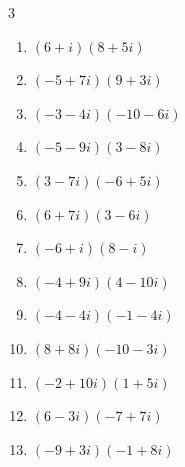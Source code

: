 \begin{multicols}{3}
\begin{enumerate}
  \item $\displaystyle (6+i)(8+5i)$

        \phantom{$\displaystyle =43+38i$}

  \item $\displaystyle (-5+7i)(9+3i)$

        \phantom{$\displaystyle =-66+48i$}

  \item $\displaystyle (-3-4i)(-10-6i)$

        \phantom{$\displaystyle =6+58i$}

  \item $\displaystyle (-5-9i)(3-8i)$

        \phantom{$\displaystyle =-87+13i$}

  \item $\displaystyle (3-7i)(-6+5i)$

        \phantom{$\displaystyle =17+57i$}

  \item $\displaystyle (6+7i)(3-6i)$

        \phantom{$\displaystyle =60-15i$}

  \item $\displaystyle (-6+i)(8-i)$

        \phantom{$\displaystyle =-47+14i$}

  \item $\displaystyle (-4+9i)(4-10i)$

        \phantom{$\displaystyle =74+76i$}

  \item $\displaystyle (-4-4i)(-1-4i)$

        \phantom{$\displaystyle =-12+20i$}

  \item $\displaystyle (8+8i)(-10-3i)$

        \phantom{$\displaystyle =-56-104i$}

  \item $\displaystyle (-2+10i)(1+5i)$

        \phantom{$\displaystyle =-52$}

\columnbreak %

  \item $\displaystyle (6-3i)(-7+7i)$

        \phantom{$\displaystyle =-21+63i$}

  \item $\displaystyle (-9+3i)(-1+8i)$


\end{enumerate}
\end{multicols}
